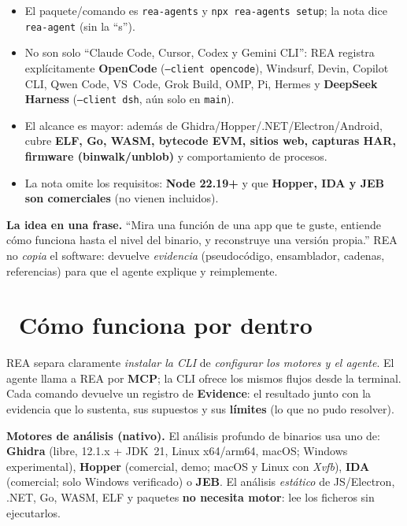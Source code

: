 \documentclass[11pt,a4paper]{article}
\newcommand{\iconotexto}[2]{\textcolor{cyanNeon}{\faIcon{#1}}~#2}
\begin{document}
\begin{tcolorbox}[cajaMejora, title={\faIcon{exclamation-triangle}~Correcciones a la nota de NotebookLM}]
\begin{itemize}[leftmargin=1.2em]
  \item El paquete/comando es \texttt{rea-agents} y \texttt{npx rea-agents setup};
  la nota dice \texttt{rea-agent} (sin la ``s'').
  \item No son solo ``Claude Code, Cursor, Codex y Gemini CLI'': REA registra
  explícitamente \textbf{OpenCode} (\texttt{--client opencode}), Windsurf, Devin, Copilot
  CLI, Qwen Code, VS~Code, Grok Build, OMP, Pi, Hermes y \textbf{DeepSeek Harness}
  (\texttt{--client dsh}, aún solo en \texttt{main}).
  \item El alcance es mayor: además de Ghidra/Hopper/.NET/Electron/Android, cubre
  \textbf{ELF, Go, WASM, bytecode EVM, sitios web, capturas HAR, firmware
  (binwalk/unblob)} y comportamiento de procesos.
  \item La nota omite los requisitos: \textbf{Node 22.19+} y que \textbf{Hopper, IDA y
  JEB son comerciales} (no vienen incluidos).
\end{itemize}
\end{tcolorbox}

\begin{cajaConcepto}
\textbf{La idea en una frase.} ``Mira una función de una app que te guste, entiende cómo
funciona hasta el nivel del binario, y reconstruye una versión propia.'' REA no \emph{copia}
el software: devuelve \emph{evidencia} (pseudocódigo, ensamblador, cadenas, referencias)
para que el agente explique y reimplemente.
\end{cajaConcepto}

\section[Arquitectura]{\iconotexto{project-diagram}{Cómo funciona por dentro}}

REA separa claramente \emph{instalar la CLI} de \emph{configurar los motores y el agente}.
El agente llama a REA por \textbf{MCP}; la CLI ofrece los mismos flujos desde la terminal.
Cada comando devuelve un registro de \textbf{Evidence}: el resultado junto con la
evidencia que lo sustenta, sus supuestos y sus \textbf{límites} (lo que no pudo resolver).

\begin{cajaConcepto}
\textbf{Motores de análisis (nativo).} El análisis profundo de binarios usa uno de:
\textbf{Ghidra} (libre, 12.1.x + JDK~21, Linux x64/arm64, macOS; Windows experimental),
\textbf{Hopper} (comercial, demo; macOS y Linux con \emph{Xvfb}), \textbf{IDA} (comercial;
solo Windows verificado) o \textbf{JEB}. El análisis \emph{estático} de JS/Electron, .NET,
Go, WASM, ELF y paquetes \textbf{no necesita motor}: lee los ficheros sin ejecutarlos.
\end{cajaConcepto}
\end{document}

